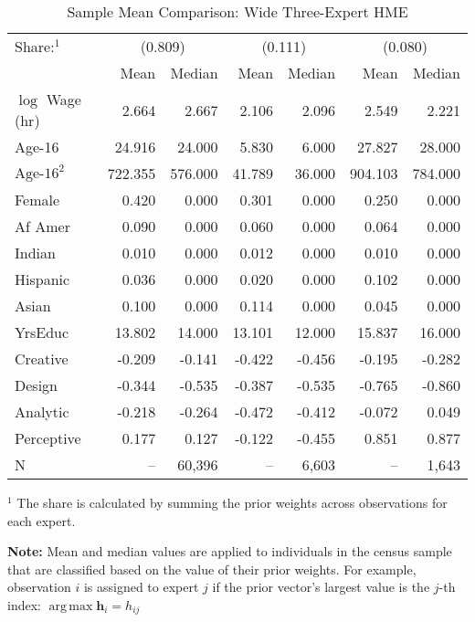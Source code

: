\documentclass[12pt]{article}
\DeclareMathOperator*{\argmax}{arg\,max}
\theoremstyle{definition}
\begin{document}
  
  \begin{table} \centering
    \caption{Sample Mean Comparison: Wide Three-Expert HME}
    \begin{threeparttable}
      \begin{tabular}[l]{l r r r r r r}
    \cmidrule{1-7}
    Share:$^{1}$& \multicolumn{2}{c}{(0.809)} & \multicolumn{2}{c}{(0.111)} & \multicolumn{2}{c}{(0.080)} \\
                & Mean & Median & Mean & Median & Mean & Median \\
    \cmidrule{1-7}
    $\log$ Wage (hr)      &   2.664 &   2.667 &  2.106 &  2.096 &   2.549 &   2.221 \\
    Age-16                &  24.916 &  24.000 &  5.830 &  6.000 &  27.827 &  28.000 \\
    $\textrm{Age-16}^{2}$ & 722.355 & 576.000 & 41.789 & 36.000 & 904.103 & 784.000 \\
    Female                &   0.420 &   0.000 &  0.301 &  0.000 &   0.250 &   0.000 \\
    Af Amer               &   0.090 &   0.000 &  0.060 &  0.000 &   0.064 &   0.000 \\
    Indian                &   0.010 &   0.000 &  0.012 &  0.000 &   0.010 &   0.000 \\
    Hispanic              &   0.036 &   0.000 &  0.020 &  0.000 &   0.102 &   0.000 \\
    Asian                 &   0.100 &   0.000 &  0.114 &  0.000 &   0.045 &   0.000 \\
    YrsEduc               &  13.802 &  14.000 & 13.101 & 12.000 &  15.837 &  16.000 \\
    Creative              &  -0.209 &  -0.141 & -0.422 & -0.456 &  -0.195 &  -0.282 \\
    Design                &  -0.344 &  -0.535 & -0.387 & -0.535 &  -0.765 &  -0.860 \\
    Analytic              &  -0.218 &  -0.264 & -0.472 & -0.412 &  -0.072 &   0.049 \\
    Perceptive            &   0.177 &   0.127 & -0.122 & -0.455 &   0.851 &   0.877 \\
    \cmidrule{1-7}
    N                     &      -- &  60,396 &     -- &  6,603 &      -- &   1,643 \\
    \hline
      \end{tabular}
      \begin{tablenotes}
        \item{\footnotesize $^{1}$ The share is calculated by summing the 
        prior weights across observations for each expert.}
        \item{\footnotesize \textbf{Note:} Mean and median values are applied to individuals in the census sample that are classified based on the value of their prior weights. For example, observation $i$ is assigned to expert $j$ if the prior vector's largest value is the $j$-th index: $\argmax \boldsymbol{h}_{i} = h_{ij}$}
      \end{tablenotes} \label{tbl:ME3_sample_comparison}
    \end{threeparttable}
  \end{table}
  
\end{document}
